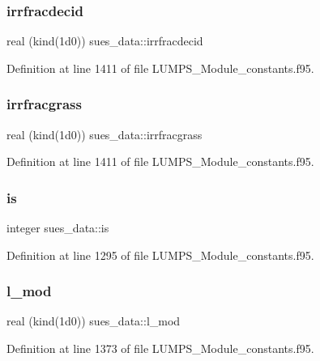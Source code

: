 \subsubsection{\texorpdfstring{irrfracdecid}{irrfracdecid}}
{\footnotesize\ttfamily real (kind(1d0)) sues\+\_\+data\+::irrfracdecid}



Definition at line 1411 of file L\+U\+M\+P\+S\+\_\+\+Module\+\_\+constants.\+f95.

\mbox{\label{namespacesues__data_ac09560182eb4e8e83479a33c9ea2f52b}} 
\subsubsection{\texorpdfstring{irrfracgrass}{irrfracgrass}}
{\footnotesize\ttfamily real (kind(1d0)) sues\+\_\+data\+::irrfracgrass}



Definition at line 1411 of file L\+U\+M\+P\+S\+\_\+\+Module\+\_\+constants.\+f95.

\mbox{\label{namespacesues__data_a38a6478771abe06a6cf4334fe858c0ef}} 
\subsubsection{\texorpdfstring{is}{is}}
{\footnotesize\ttfamily integer sues\+\_\+data\+::is}



Definition at line 1295 of file L\+U\+M\+P\+S\+\_\+\+Module\+\_\+constants.\+f95.

\mbox{\label{namespacesues__data_a7623dce80601c63b78d744b4a5036ad2}} 
\subsubsection{\texorpdfstring{l\+\_\+mod}{l\_mod}}
{\footnotesize\ttfamily real (kind(1d0)) sues\+\_\+data\+::l\+\_\+mod}



Definition at line 1373 of file L\+U\+M\+P\+S\+\_\+\+Module\+\_\+constants.\+f95.

